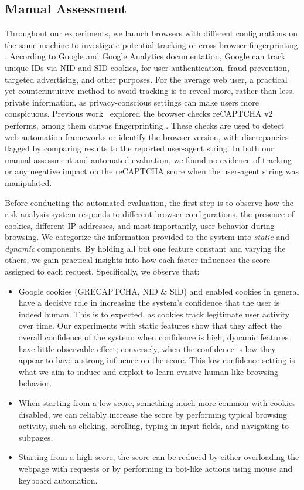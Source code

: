 \subsection{Manual Assessment}
\label{sub:empirical}

Throughout our experiments, we launch browsers with different configurations on the same machine to investigate potential tracking or cross-browser fingerprinting \cite{boda2011user}.
According to Google and Google Analytics documentation, Google can track unique IDs via NID and SID cookies, for user authentication, fraud prevention, targeted advertising, and other purposes.
For the average web user, a practical yet counterintuitive method to avoid tracking is to reveal more, rather than less, private information, as privacy-conscious settings can make users more conspicuous.
Previous work~\cite{sivakorn2016robot} explored the browser checks reCAPTCHA v2 performs, among them canvas fingerprinting \cite{mowery2012pixel}.
These checks are used to detect web automation frameworks or identify the browser version, with discrepancies flagged by comparing results to the reported user-agent string.
In both our manual assessment and automated evaluation, we found no evidence of tracking or any negative impact on the reCAPTCHA score when the user-agent string was manipulated.

Before conducting the automated evaluation, the first step is to observe how the risk analysis system responds to different browser configurations, the presence of cookies, different IP addresses, and most importantly, user behavior during browsing. 
We categorize the information provided to the system into \emph{static} and \emph{dynamic} components.
By holding all but one feature constant and varying the others, we gain practical insights into how each factor influences the score assigned to each request. Specifically, we observe that:

\begin{itemize}
  \item Google cookies (GRECAPTCHA, NID \& SID) and enabled cookies in general have a decisive role in increasing the system's confidence that the user is indeed human. This is to expected, as cookies track legitimate user activity over time.
  Our experiments with static features show that they affect the overall confidence of the system: when confidence is high, dynamic features have little observable effect; conversely, when the confidence is low they appear to have a strong influence on the score.
  This low-confidence setting is what we aim to induce and exploit to learn evasive human-like browsing behavior.
  \item When starting from a low score, something much more common with cookies disabled, we can reliably increase the score by performing typical browsing activity, such as clicking, scrolling, typing in input fields, and navigating to subpages.
  \item Starting from a high score, the score can be reduced by either overloading the webpage with requests or by performing in bot-like actions using mouse and keyboard automation.
\end{itemize}

